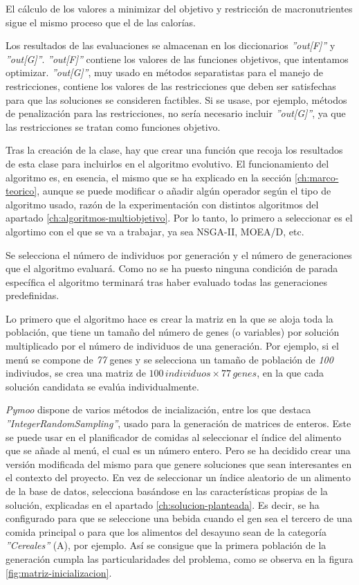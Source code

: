 El cálculo de los valores a minimizar del objetivo y restricción de macronutrientes sigue el mismo proceso que el de las calorías.

Los resultados de las evaluaciones se almacenan en los diccionarios \textit{''out[F]''} y \textit{''out[G]''}. \textit{''out[F]''} contiene los valores de las funciones objetivos, que intentamos optimizar. \textit{''out[G]''}, muy usado en métodos separatistas para el manejo de restricciones, contiene los valores de las restricciones que deben ser satisfechas para que las soluciones se consideren factibles. Si se usase, por ejemplo, métodos de penalización para las restricciones, no sería necesario incluir \textit{''out[G]''}, ya que las restricciones se tratan como funciones objetivo. 

Tras la creación de la clase, hay que crear una función que recoja los resultados de esta clase para incluirlos en el algoritmo evolutivo. El funcionamiento del algoritmo es, en esencia, el mismo que se ha explicado en la sección \ref{ch:marco-teorico}, aunque se puede modificar o añadir algún operador según el tipo de algoritmo usado, razón de la experimentación con distintos algoritmos del apartado \ref{ch:algoritmos-multiobjetivo}. Por lo tanto, lo primero a seleccionar es el algortimo con el que se va a trabajar, ya sea NSGA-II, MOEA/D, etc.

Se selecciona el número de individuos por generación y el número de generaciones que el algoritmo evaluará. Como no se ha puesto ninguna condición de parada específica el algoritmo terminará tras haber evaluado todas las generaciones predefinidas.

Lo primero que el algoritmo hace es crear la matriz en la que se aloja toda la población, que tiene un tamaño del número de genes (o variables) por solución multiplicado por el número de individuos de una generación. Por ejemplo, si el menú se compone de \textit{77} genes y se selecciona un tamaño de población de \textit{100} indiviudos, se crea una matriz de \(100 \, individuos \times 77 \, genes\), en la que cada solución candidata se evalúa individualmente.

\textit{Pymoo} dispone de varios métodos de incialización, entre los que destaca \textit{''IntegerRandomSampling''}, usado para la generación de matrices de enteros. Este se puede usar en el planificador de comidas al seleccionar el índice del alimento que se añade al menú, el cual es un número entero. Pero se ha decidido crear una versión modificada del mismo para que genere soluciones que sean interesantes en el contexto del proyecto. En vez de seleccionar un índice aleatorio de un alimento de la base de datos, selecciona basándose en las características propias de la solución, explicadas en el apartado \ref{ch:solucion-planteada}. Es decir, se ha configurado para que se seleccione una bebida cuando el gen sea el tercero de una comida principal o para que los alimentos del desayuno sean de la categoría \textit{''Cereales''} (A), por ejemplo. Así se consigue que la primera población de la generación cumpla las particularidades del problema, como se observa en la figura \ref{fig:matriz-inicializacion}.

